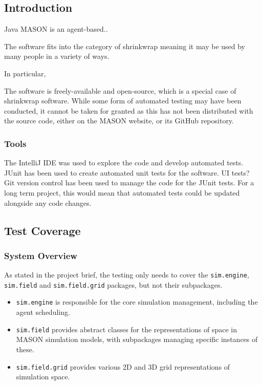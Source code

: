 \documentclass[11pt]{article}
\begin{document}
\subsection{Introduction}
Java MASON is an agent-based..

The software fits into the category of shrinkwrap meaning it may be used by many people in a variety of ways.

In particular, 

The software is freely-available and open-source, which is a special case of shrinkwrap software.
While some form of automated testing may have been conducted, it cannot be taken for granted as this has not been distributed with the source code, either on the MASON website, or its GitHub repository.

\subsubsection{Tools}
The IntelliJ IDE was used to explore the code and develop automated tests.
JUnit has been used to create automated unit tests for the software.
UI tests?
\\

Git version control has been used to manage the code for the JUnit tests. For a long term project, this would mean that automated tests could be updated alongside any code changes.

\subsection{Test Coverage}
\subsubsection{System Overview}
As stated in the project brief, the testing only needs to cover the \texttt{sim.engine}, \texttt{sim.field} and \texttt{sim.field.grid} packages, but not their subpackages.
\begin{itemize}
\item \texttt{sim.engine} is responsible for the core simulation management, including the agent scheduling.
\item \texttt{sim.field} provides abstract classes for the representations of space in MASON simulation models, with subpackages managing specific instances of these.
\item \texttt{sim.field.grid} provides various 2D and 3D grid representations of simulation space.
\end{itemize}
\end{document}

